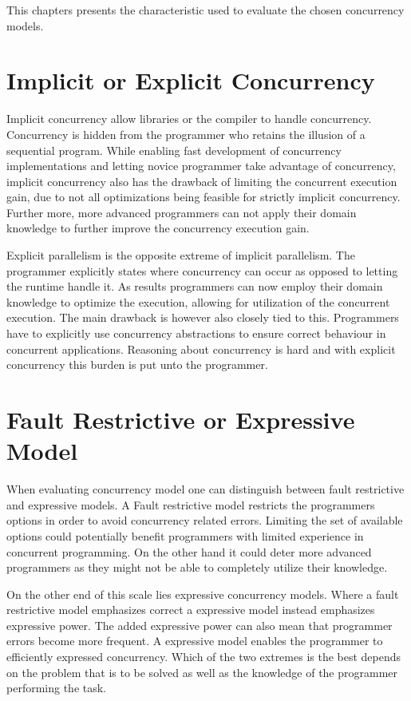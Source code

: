 \makeatletter {}\makeatother
{}
This chapters presents the characteristic used to evaluate the chosen concurrency models. 
\label{chap:char}
\section{Implicit or Explicit Concurrency}
Implicit concurrency allow libraries or the compiler to handle concurrency. Concurrency is hidden from the programmer who retains the illusion of a sequential program\cite[p. 59]{sutter2005software}. While enabling fast development of concurrency implementations and letting novice programmer take advantage of concurrency, implicit concurrency also has the drawback of limiting the concurrent execution gain, due to not all optimizations being feasible for strictly implicit concurrency. Further more, more advanced programmers can not apply their domain knowledge to further improve the concurrency execution gain.

Explicit parallelism is the opposite extreme of implicit parallelism. The programmer explicitly states where concurrency can occur as opposed to letting the runtime handle it\cite[p. 59]{sutter2005software}. As results programmers can now employ their domain knowledge to optimize the execution, allowing for utilization of the concurrent execution. The main drawback is however also closely tied to this. Programmers have to explicitly use concurrency abstractions to ensure correct behaviour in concurrent applications. Reasoning about concurrency is hard\cite[p. 56]{sutter2005software} and with explicit concurrency this burden is put unto the programmer.

\section{Fault Restrictive or Expressive Model}
When evaluating concurrency model one can distinguish between fault restrictive and expressive models. A Fault restrictive model restricts the programmers options in order to avoid concurrency related errors. Limiting the set of available options could potentially benefit programmers with limited experience in concurrent programming. On the other hand it could deter more advanced programmers as they might not be able to completely utilize their knowledge.

On the other end of this scale lies expressive concurrency models. Where a fault restrictive model emphasizes correct a expressive model instead emphasizes expressive power. The added expressive power can also mean that programmer errors become more frequent. A expressive model enables the programmer to efficiently expressed concurrency. Which of the two extremes is the best depends on the problem that is to be solved as well as the knowledge of the programmer performing the task.
 
